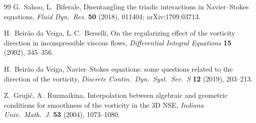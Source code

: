 \documentclass[11pt]{article}
\theoremstyle{definition}
\theoremstyle{remark}
\begin{document}
\begin{thebibliography}{99}
 G.~Sahoo, L.~Biferale,
  Disentangling the triadic interactions in Navier--Stokes equations,
  \textit{Fluid Dyn.\ Res.} \textbf{50} (2018), 011404;
  arXiv:1709.03713.

 H.~Beir\~ao da Veiga, L.\,C.~Berselli,
  On the regularizing effect of the vorticity direction in
  incompressible viscous flows, \textit{Differential Integral
  Equations} \textbf{15} (2002), 345--356.

 H.~Beir\~ao da Veiga,
  Navier--Stokes equations: some questions related to the direction
  of the vorticity, \textit{Discrete Contin.\ Dyn.\ Syst.\ Ser.\ S}
  \textbf{12} (2019), 203--213.

 Z.~Gruji\'c, A.~Ruzmaikina,
  Interpolation between algebraic and geometric conditions for
  smoothness of the vorticity in the 3D NSE, \textit{Indiana Univ.\
  Math.\ J.} \textbf{53} (2004), 1073--1080.
\end{thebibliography}
\end{document}
